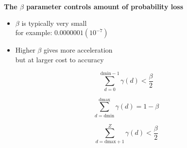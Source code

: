 \documentclass[landscape]{slides}
\begin{document}
\begin{slide}
\begin{center}
\textbf{The $\beta$ parameter controls amount of probability loss}
\end{center}

\begin{minipage}{6in}


\vspace{1in}
\begin{itemize} 
\item $\beta$ is typically very small \\
  for example: $0.0000001 (10^{-7})$

\item Higher $\beta$ gives more acceleration \\ but at larger cost to
  accuracy
\end{itemize}

\vspace{1.5in}
\end{minipage}
\begin{minipage}{4in}

\small

\[
   \sum_{d = 0}^{\mbox{dmin} - 1} \gamma(d) < \frac{\beta}{2}
\]

\[
   \sum_{d = \mbox{dmin}}^{\mbox{dmax}} \gamma(d) = 1 - \beta
\]

\[
   \sum_{d = \mbox{dmax} + 1}^{Z} \gamma(d) < \frac{\beta}{2}
\]


\vspace{3in}
\end{minipage}


\end{slide}
\end{document}
